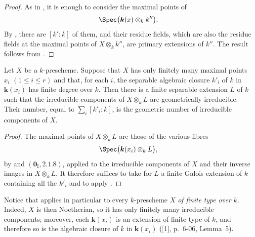 \begin{proof}
As in , it is enough to consider the maximal points of
\[
\Spec\bigl(\boldsymbol{k}(x)\otimes_k k''\bigr).
\]
By , there are $[k':k]$ of them, and their residue
fields, which are also the residue fields at the maximal points of
$X\otimes_k k''$, are primary extensions of $k''$.
The result follows from .
\end{proof}

\begin{corollary}[4.5.11]
\label{IV.4.5.11}
Let $X$ be a $k$-prescheme.
Suppose that $X$ has only finitely many maximal points
$x_i$ $(1\leq i\leq r)$ and that, for each $i$, the separable
algebraic closure $k'_i$ of $k$ in $\boldsymbol{k}(x_i)$ has finite degree
over $k$.
Then there is a finite separable extension $L$ of $k$ such that the
irreducible components of $X\otimes_k L$ are geometrically
irreducible.
Their number, equal to $\sum_i[k'_i:k]$,
is the geometric number of irreducible components of $X$.
\end{corollary}

\begin{proof}
The maximal points of $X\otimes_k L$ are those of the various fibres
\[
\Spec\bigl(\boldsymbol{k}(x_i)\otimes_k L\bigr),
\]
by  and $(\mathbf{0}_{\mathrm I},2.1.8)$, applied to
the irreducible components of $X$ and their inverse images in
$X\otimes_k L$.
It therefore suffices to take for $L$ a finite Galois extension of
$k$ containing all the $k'_i$ and to apply .
\end{proof}

Notice that  applies in particular to every
$k$-prescheme $X$ \emph{of finite type over $k$}.
Indeed, $X$ is then Noetherian, so it has only finitely many
irreducible components; moreover, each $\boldsymbol{k}(x_i)$ is an extension
of finite type of $k$, and therefore so is the algebraic closure of
$k$ in $\boldsymbol{k}(x_i)$ ([1], p.~6-06, Lemma~5).

